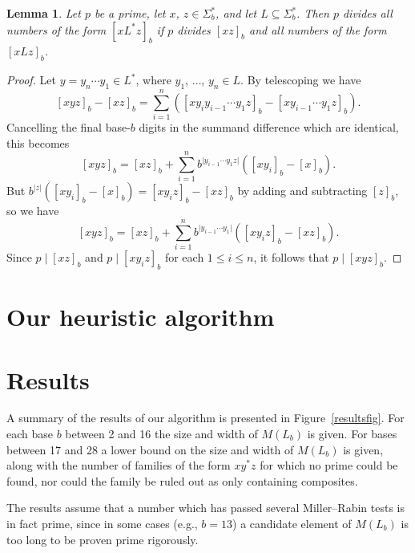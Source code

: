 \documentclass[12pt]{article}
\theoremstyle{plain}
\newtheorem{lemma}[theorem]{Lemma}
\theoremstyle{definition}
\theoremstyle{remark}
\begin{document}
\begin{lemma}
Let $p$ be a prime, let $x$, $z\in \Sigma^*_b$, and let $L\subseteq\Sigma^*_b$.
Then $p$ divides all numbers of the form $[xL^*z]_b$ if\/ 
$p$ divides $[xz]_b$ and all numbers of the form $[xLz]_b$.
\end{lemma}
\begin{proof}
Let $y=y_n\dotsm y_1\in L^*$, where $y_1$, $\dotsc$, $y_n\in L$.  By telescoping we have
\[ [xyz]_b - [xz]_b = \sum_{i=1}^{n}([xy_{i}y_{i-1}\dotsm y_1 z]_b-[xy_{i-1}\dotsm y_1 z]_b) . \]
Cancelling the final base-$b$ digits in the summand difference which are identical, this becomes
\[ [xyz]_b = [xz]_b + \sum_{i=1}^{n}b^{\lvert{y_{i-1}\dotsm y_1 z}\rvert}([xy_i]_b-[x]_b) . \]
But $b^{\lvert z\rvert}([xy_i]_b-[x]_b)=[xy_iz]_b-[xz]_b$ by adding and subtracting $[z]_b$, so we have
\[ [xyz]_b = [xz]_b + \sum_{i=1}^{n}b^{\vert{y_{i-1}\dotsm y_1}\rvert}([xy_iz]_b-[xz]_b) . \]
Since $p\mid[xz]_b$ and $p\mid[xy_iz]_b$ for each $1\leq i\leq n$, it follows that $p\mid[xyz]_b$.
\end{proof}

\section{Our heuristic algorithm}

\section{Results}
A summary of the results of our algorithm is presented in Figure~\ref{resultsfig}.
For each base $b$ between 2 and 16 the size and width of $M(L_b)$ is given.
For bases between 17 and 28 a lower bound on the size and width of $M(L_b)$ is given,
along with the number of families of the form $xy^*z$ for which no prime could be found,
nor could the family be ruled out as only containing composites.

The results assume that a number which has passed several Miller--Rabin
tests is in fact prime, since in some cases (e.g., $b=13$) a candidate element of $M(L_b)$
is too long to be proven prime rigorously.
\end{document}
